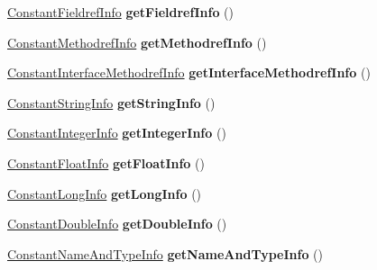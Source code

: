 \begin{DoxyCompactItemize}
\item 
\hyperlink{structConstantFieldrefInfo}{Constant\+Fieldref\+Info} {\bfseries get\+Fieldref\+Info} ()\hypertarget{classCPInfo_ac671e911cb4b8872bd55d9a5b9f146d9}{}\label{classCPInfo_ac671e911cb4b8872bd55d9a5b9f146d9}

\item 
\hyperlink{structConstantMethodrefInfo}{Constant\+Methodref\+Info} {\bfseries get\+Methodref\+Info} ()\hypertarget{classCPInfo_ae3903d798cb11da2eb29062926a7b3f3}{}\label{classCPInfo_ae3903d798cb11da2eb29062926a7b3f3}

\item 
\hyperlink{structConstantInterfaceMethodrefInfo}{Constant\+Interface\+Methodref\+Info} {\bfseries get\+Interface\+Methodref\+Info} ()\hypertarget{classCPInfo_a42a8c3a04e943cf3e861f05078561e87}{}\label{classCPInfo_a42a8c3a04e943cf3e861f05078561e87}

\item 
\hyperlink{structConstantStringInfo}{Constant\+String\+Info} {\bfseries get\+String\+Info} ()\hypertarget{classCPInfo_adb44f35169d1e959e5c53e6a76bfcbf5}{}\label{classCPInfo_adb44f35169d1e959e5c53e6a76bfcbf5}

\item 
\hyperlink{structConstantIntegerInfo}{Constant\+Integer\+Info} {\bfseries get\+Integer\+Info} ()\hypertarget{classCPInfo_ac4ceb48810a05b9e9b7fbd2839f9e1e4}{}\label{classCPInfo_ac4ceb48810a05b9e9b7fbd2839f9e1e4}

\item 
\hyperlink{structConstantFloatInfo}{Constant\+Float\+Info} {\bfseries get\+Float\+Info} ()\hypertarget{classCPInfo_ac293e1108e36e6296e3b85576689e6cb}{}\label{classCPInfo_ac293e1108e36e6296e3b85576689e6cb}

\item 
\hyperlink{structConstantLongInfo}{Constant\+Long\+Info} {\bfseries get\+Long\+Info} ()\hypertarget{classCPInfo_ad493f187e55c0f37c2705f159a7487d9}{}\label{classCPInfo_ad493f187e55c0f37c2705f159a7487d9}

\item 
\hyperlink{structConstantDoubleInfo}{Constant\+Double\+Info} {\bfseries get\+Double\+Info} ()\hypertarget{classCPInfo_a7192445d7605e9515e3b4a5883f3b0ef}{}\label{classCPInfo_a7192445d7605e9515e3b4a5883f3b0ef}

\item 
\hyperlink{structConstantNameAndTypeInfo}{Constant\+Name\+And\+Type\+Info} {\bfseries get\+Name\+And\+Type\+Info} ()\hypertarget{classCPInfo_ae9f2c4975801d3cfc6b98a115b26fe55}{}\label{classCPInfo_ae9f2c4975801d3cfc6b98a115b26fe55}


\end{DoxyCompactItemize}
